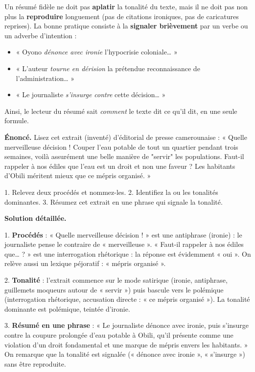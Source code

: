 \documentclass[11pt]{article}
\newcommand{\cle}[1]{{\popxbold\color{popdark}#1}}
\begin{document}
\begin{aretenir}
Un résumé fidèle ne doit pas \textbf{aplatir} la tonalité du texte, mais il ne doit pas non plus la \textbf{reproduire} longuement (pas de citations ironiques, pas de caricatures reprises). La bonne pratique consiste à la \textbf{signaler brièvement} par un verbe ou un adverbe d'intention :
\begin{itemize}
\item « Oyono \emph{dénonce avec ironie} l'hypocrisie coloniale… »
\item « L'auteur \emph{tourne en dérision} la prétendue reconnaissance de l'administration… »
\item « Le journaliste \emph{s'insurge contre} cette décision… »
\end{itemize}
Ainsi, le lecteur du résumé sait \emph{comment} le texte dit ce qu'il dit, en une seule formule.
\end{aretenir}

\begin{exoresolu}
\textbf{Énoncé.} Lisez cet extrait (inventé) d'éditorial de presse camerounaise : « Quelle merveilleuse décision ! Couper l'eau potable de tout un quartier pendant trois semaines, voilà assurément une belle manière de "servir" les populations. Faut-il rappeler à nos édiles que l'eau est un droit et non une faveur ? Les habitants d'Obili méritent mieux que ce mépris organisé. »

1. Relevez deux procédés et nommez-les. 2. Identifiez la ou les tonalités dominantes. 3. Résumez cet extrait en une phrase qui signale la tonalité.

\tcblower
\textbf{Solution détaillée.}

1. \textbf{Procédés} : « Quelle merveilleuse décision ! » est une \cle{antiphrase} (ironie) : le journaliste pense le contraire de « merveilleuse ». « Faut-il rappeler à nos édiles que… ? » est une \cle{interrogation rhétorique} : la réponse est évidemment « oui ». On relève aussi un \cle{lexique péjoratif} : « mépris organisé ».

2. \textbf{Tonalité} : l'extrait commence sur le mode \cle{satirique} (ironie, antiphrase, guillemets moqueurs autour de « servir ») puis bascule vers le \cle{polémique} (interrogation rhétorique, accusation directe : « ce mépris organisé »). La tonalité dominante est polémique, teintée d'ironie.

3. \textbf{Résumé en une phrase} : « Le journaliste dénonce avec ironie, puis s'insurge contre la coupure prolongée d'eau potable à Obili, qu'il présente comme une violation d'un droit fondamental et une marque de mépris envers les habitants. » On remarque que la tonalité est signalée (« dénonce avec ironie », « s'insurge ») sans être reproduite.
\end{exoresolu}
\end{document}
